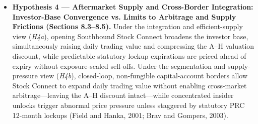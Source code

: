 \documentclass[11pt,letterpaper]{article}
\begin{document}
\begin{itemize}
\item \textbf{Hypothesis 4 — Aftermarket Supply and Cross-Border Integration: Investor-Base Convergence vs. Limits to Arbitrage and Supply Frictions (Sections 8.3–8.5).} Under the integration and efficient-supply view (\textit{H4a}), opening Southbound Stock Connect broadens the investor base, simultaneously raising daily trading value and compressing the A–H valuation discount, while predictable statutory lockup expirations are priced ahead of expiry without exposure-scaled sell-offs. Under the segmentation and supply-pressure view (\textit{H4b}), closed-loop, non-fungible capital-account borders allow Stock Connect to expand daily trading value without enabling cross-market arbitrage—leaving the A–H discount intact—while concentrated insider unlocks trigger abnormal price pressure unless staggered by statutory PRC 12-month lockups (Field and Hanka, 2001; Brav and Gompers, 2003).
\end{itemize}
\end{document}
